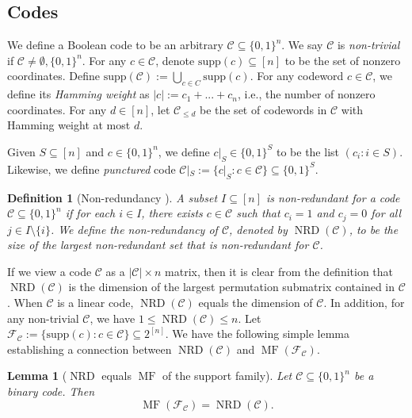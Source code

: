 \documentclass{article}
\newtheorem{lemma}[lemma]{Lemma}
\newtheorem{definition}[definition]{Definition}
\DeclareMathOperator{\NRD}{NRD}
\DeclareMathOperator{\MF}{MF}
\newcommand{\<}{\langle}
\renewcommand{\>}{\rangle}
\newcommand{\calC}{\mathcal{C}}
\newcommand{\calF}{\mathcal{F}}
\newcommand{\supp}{\mathrm{supp}}
\begin{document}
\subsection{Codes}

We define a Boolean code to be an arbitrary $\calC \subseteq \{0,1\}^n$. We say $\calC$ is \emph{non-trivial} if $\calC \neq \emptyset, \{0, 1\}^n$. For any $c \in \calC$, denote $\supp (c) \subseteq [n]$ to be the set of nonzero coordinates. Define $\supp (\calC) := \bigcup_{c \in C}\supp (c)$. For any codeword $c \in \calC$, we define its \emph{Hamming weight} as $| c |:= c_1 + ... + c_n$, i.e., the number of nonzero coordinates. For any $d \in [n]$, let $\calC_{\leq d}$ be the set of codewords in $\calC$ with Hamming weight at most $d$.

Given $S \subseteq [n]$ and $c \in \{0,1\}^n$, we define $c|_S \in \{0, 1\}^S$ to be the list $(c_i: i \in S)$. Likewise, we define \emph{punctured} code $\calC|_{S}:= \{c|_{S}: c \in \calC\} \subseteq \{0, 1\}^S$.

\begin{definition}[Non-redundancy \cite{BG25}]\label{definition:non-redundancy}
    A subset $I \subseteq [n]$ is \emph{non-redundant} for a code $\calC \subseteq \{0, 1\}^n$ if for each $i \in I$, there exists $c \in \calC$ such that $c_i=1$ and $c_j=0$ for all $j \in I \setminus \{i\}$.
    We define the \emph{non-redundancy} of $\calC$, denoted by $\NRD(\calC)$, to be the size of the largest non-redundant set that is non-redundant for $\calC$.
\end{definition}
If we view a code $\calC$ as a $|\calC| \times n$ matrix, then it is clear from the definition that $\NRD(\calC)$ is the dimension of the largest permutation submatrix contained in $\calC$. When $\calC$ is a linear code, $\NRD(\calC)$ equals the dimension of $\calC$. In addition, for any non-trivial $\calC$, we have $1 \leq \NRD(\calC) \leq n$. Let $\calF_{\calC}:= \{\supp(c): c\in \calC\}\subseteq 2^{[n]}$. We have the following simple lemma establishing a connection between $\NRD (\calC)$ and $\MF(\calF_{\calC})$.

\begin{lemma}[$\NRD$ equals $\MF$ of the support family]\label{lem:equivalence_between_NRD_and_WSF}
Let $\calC\subseteq\{0,1\}^n$ be a binary code. Then
\[
\MF(\mathcal F_{\calC})=\NRD(\calC).
\]
\end{lemma}
\end{document}
